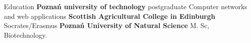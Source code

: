 \begin{rubric}{Education}
\entry*[2010 -- 2011]\textbf{Poznań university of technology}\newline
    postgraduate\newline
    Computer networks and web applications
\entry*[2005]\textbf{Scottish Agricultural College in Edinburgh}\newline
    Socrates/Erasmus
\entry*[2001 -- 2006]\textbf{Poznań University of Natural Science}\newline
    M. Sc,\newline
    Biotechnology.
\end{rubric}

